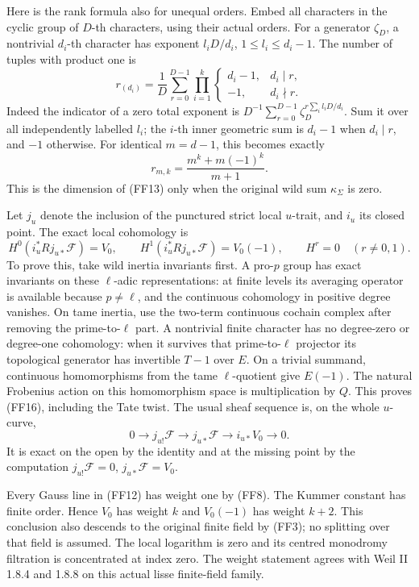 \documentclass[11pt,a4paper]{article}
\theoremstyle{definition}
\begin{document}
Here is the rank formula also for unequal orders.  Embed all characters
in the cyclic group of \(D\)-th characters, using their actual orders.
For a generator \(\zeta_D\), a nontrivial \(d_i\)-th character has
exponent \(l_iD/d_i\), \(1\le l_i\le d_i-1\).
The number of tuples with product one is
\[
 r_{(d_i)}
  =\frac1D\sum_{r=0}^{D-1}
       \prod_{i=1}^k
       \begin{cases}d_i-1,&d_i\mid r,\\-1,&d_i\nmid r.\end{cases}
                                                               \tag{FF14}
\]
Indeed the indicator of a zero total exponent is
\(D^{-1}\sum_{r=0}^{D-1}
       \zeta_D^{r\sum_i l_iD/d_i}\).
Sum it over all independently labelled \(l_i\); the \(i\)-th inner
geometric sum is \(d_i-1\) when \(d_i\mid r\), and \(-1\) otherwise.
For identical \(m=d-1\), this becomes exactly
\[
 r_{m,k}=\frac{m^k+m(-1)^k}{m+1}.                       \tag{FF15}
\]
This is the dimension of (FF13) only when the original wild sum
\(\kappa_\Sigma\) is zero.

Let \(j_u\) denote the inclusion of the punctured strict local
\(u\)-trait, and \(i_u\) its closed point.  The exact local cohomology is
\[
 H^0(i_u^*Rj_{u*}\mathcal F)=V_0,\qquad
 H^1(i_u^*Rj_{u*}\mathcal F)=V_0(-1),\qquad
 H^r=0\quad(r\ne0,1).                                  \tag{FF16}
\]
To prove this, take wild inertia invariants first.  A pro-\(p\)
group has exact invariants on these \(\ell\)-adic representations:
at finite levels its averaging operator is available because
\(p\ne\ell\), and the continuous cohomology in positive degree vanishes.
On tame inertia, use the two-term continuous cochain complex after
removing the prime-to-\(\ell\) part.  A nontrivial finite character
has no degree-zero or degree-one cohomology: when it survives that
prime-to-\(\ell\) projector its topological generator has invertible
\(T-1\) over \(E\).  On a trivial summand, continuous homomorphisms
from the tame \(\ell\)-quotient give \(E(-1)\).  The natural
Frobenius action on this homomorphism space is multiplication by \(Q\).
This proves (FF16), including the Tate twist.  The usual sheaf sequence
is, on the whole \(u\)-curve,
\[
 0\longrightarrow j_{u!}\mathcal F
 \longrightarrow j_{u*}\mathcal F
 \longrightarrow i_{u*}V_0\longrightarrow0.            \tag{FF17}
\]
It is exact on the open by the identity and at the missing point by
the computation \(j_{u!}\mathcal F=0\), \(j_{u*}\mathcal F=V_0\).

Every Gauss line in (FF12) has weight one by (FF8).
The Kummer constant has finite order.  Hence \(V_0\) has weight \(k\)
and \(V_0(-1)\) has weight \(k+2\).  This conclusion also descends to
the original finite field by (FF3); no splitting over that field is
assumed.  The local logarithm is zero and its centred monodromy
filtration is concentrated at index zero.  The weight statement agrees
with Weil II 1.8.4 and 1.8.8 on this actual lisse finite-field family.
\end{document}
